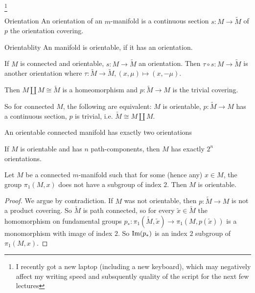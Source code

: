 \documentclass[language=english]{TemplateLecture}
\begin{document}
\footnote{I recently got a new laptop (including a new keyboard), which may negatively affect my writing speed and subsquently quality of the script for the next few lectures}


\begin{defi}{Orientation}{}
    An orientation of an \(m\)-manifold is a continuous section \(s\colon M \to \tilde M\) of \(p\) the orientation covering.
\end{defi}

\begin{defi}{Orientablity}{}
    An manifold is orientable, if it has an orientation.
\end{defi}

\begin{remark}
    If \(M\) is connected and orientable, \(s\colon M \to \tilde M\) an orientation. Then \(\tau \circ s \colon M \to \tilde M\) is another orientation where
    \(\tau \colon \tilde M \to \tilde M, (x, \mu) \mapsto (x, -\mu)\).

    Then \(M \amalg M \cong \tilde M\) is a homeomorphism and \(p\colon \tilde M \to M\) is the trivial covering.

    So for connected \(M\), the following are equivalent: \(M\) is orientable, \(p\colon \tilde M \to M\) has a continuous section, \(p\) is trivial, i.e. \(\tilde M \cong M\amalg M\).

    An orientable connected manifold has exactly two orientations

    If \(M\) is orientable and has \(n\) path-components, then \(M\) has exactly \(2^n\) orientations.
\end{remark}

\begin{corollary}
    Let \(M\) be a connected  \(m\)-manifold such that for some (hence any) \(x \in M\), the group \(\pi_1(M, x)\) does not have a subgroup of index \(2\). Then \(M\) is orientable.
\end{corollary}

\begin{proof}
    We argue by contradiction. If \(M\) was not orientable, then \(p\colon \tilde M \to M\) is not a product covering. So \(\tilde M\) is path connected, so for every \(\tilde x \in \tilde M\) the homomorphism on fundamental groups \(p_*\colon \pi_1(\tilde M, \tilde x) \to \pi_1(M, p(\tilde x))\) is a monomorphism with image of index \(2\). So \(\operatorname{Im}(p_*)\) is an index \(2\) subgroup of \(\pi_1(M,x)\).
\end{proof}
\end{document}
